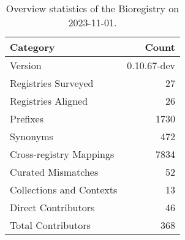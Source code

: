 \begin{table}
\caption{Overview statistics of the Bioregistry on 2023-11-01.}
\label{tab:bioregistry-summary}
\begin{tabular}{lr}
\toprule
Category & Count \\
\midrule
Version & 0.10.67-dev \\
Registries Surveyed & 27 \\
Registries Aligned & 26 \\
Prefixes & 1730 \\
Synonyms & 472 \\
Cross-registry Mappings & 7834 \\
Curated Mismatches & 52 \\
Collections and Contexts & 13 \\
Direct Contributors & 46 \\
Total Contributors & 368 \\
\bottomrule
\end{tabular}
\end{table}

